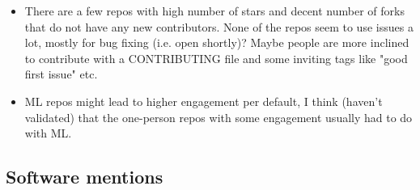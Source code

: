 \documentclass[10pt,a4paper]{scrartcl}
\begin{document}
\begin{itemize}
    \item There are a few repos with high number of stars and decent number of forks that do not have any new contributors. None of the repos seem to use issues a lot, mostly for bug fixing (i.e. open shortly)? Maybe people are more inclined to contribute with a CONTRIBUTING file and some inviting tags like "good first issue" etc.
    \item ML repos might lead to higher engagement per default, I think (haven't validated) that the one-person repos with some engagement usually had to do with ML.
\end{itemize}

\subsection*{Software mentions}
\end{document}
